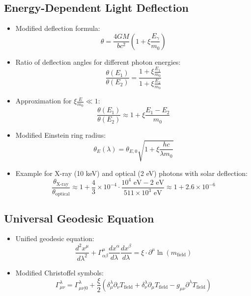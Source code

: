 \documentclass[12pt,a4paper]{article}
\begin{document}
	\subsection{Energy-Dependent Light Deflection}
	\begin{itemize}
		\item Modified deflection formula:
		\begin{equation}
			\boxed{\theta = \frac{4GM}{bc^2}\left(1 + \xi \frac{E_\gamma}{m_0}\right)}
		\end{equation}
		
		\item Ratio of deflection angles for different photon energies:
		\begin{equation}
			\frac{\theta(E_1)}{\theta(E_2)} = \frac{1 + \xi \frac{E_1}{m_0}}{1 + \xi \frac{E_2}{m_0}}
		\end{equation}
		
		\item Approximation for $\xi \frac{E}{m_0} \ll 1$:
		\begin{equation}
			\frac{\theta(E_1)}{\theta(E_2)} \approx 1 + \xi \frac{E_1 - E_2}{m_0}
		\end{equation}
		
		\item Modified Einstein ring radius:
		\begin{equation}
			\theta_E(\lambda) = \theta_{E,0} \sqrt{1 + \xi \frac{hc}{\lambda m_0}}
		\end{equation}
		
		\item Example for X-ray (10 keV) and optical (2 eV) photons with solar deflection:
		\begin{equation}
			\frac{\theta_{\text{X-ray}}}{\theta_{\text{optical}}} \approx 1 + \frac{4}{3} \times 10^{-4} \cdot \frac{10^4 \text{ eV} - 2 \text{ eV}}{511 \times 10^3 \text{ eV}} \approx 1 + 2.6 \times 10^{-6}
		\end{equation}
	\end{itemize}
	
	\subsection{Universal Geodesic Equation}
	\begin{itemize}
		\item Unified geodesic equation:
		\begin{equation}
			\boxed{\frac{d^2 x^\mu}{d\lambda^2} + \Gamma^\mu_{\alpha\beta}\frac{dx^\alpha}{d\lambda}\frac{dx^\beta}{d\lambda} = \xi \cdot \partial^\mu \ln(m_{\text{field}})}
		\end{equation}
		
		\item Modified Christoffel symbols:
		\begin{equation}
			\Gamma^\lambda_{\mu\nu} = \Gamma^\lambda_{\mu\nu|0} + \frac{\xi}{2} \left(\delta^\lambda_\mu \partial_\nu T_{\text{field}} + \delta^\lambda_\nu \partial_\mu T_{\text{field}} - g_{\mu\nu} \partial^\lambda T_{\text{field}}\right)
		\end{equation}
	\end{itemize}
	
\end{document}
